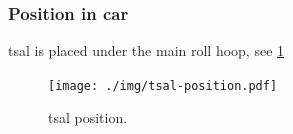 \subsubsection{Position in car}
\gls{tsal} is placed under the main roll hoop, see \ref{fig:TSAL-position}

\begin{figure}[H]
	\centering
	\texttt{[image: ./img/tsal-position.pdf]}
	\caption{\Gls{tsal} position.}
	\label{fig:TSAL-position}
\end{figure}
